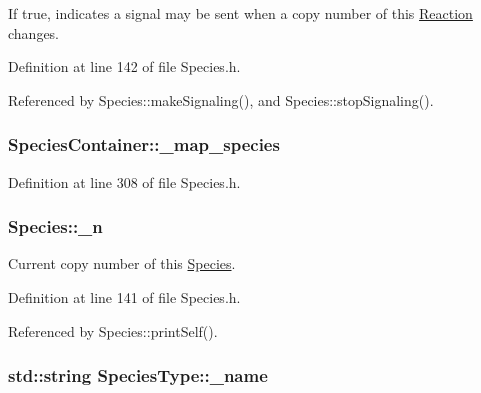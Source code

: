 If true, indicates a signal may be sent when a copy number of this \hyperlink{classReaction}{Reaction} changes. 



Definition at line 142 of file Species.\-h.



Referenced by Species\-::make\-Signaling(), and Species\-::stop\-Signaling().

\hypertarget{group__Chemistry_gab3e597371bf2edebc968a6980479e2da}{
\subsubsection[{\-\_\-map\-\_\-species}]{ {\bf Species\-Container\-::\-\_\-map\-\_\-species}}}\label{group__Chemistry_gab3e597371bf2edebc968a6980479e2da}


Definition at line 308 of file Species.\-h.

\hypertarget{group__Chemistry_gaec9a5cfb6a2f80e122f6369ae404b89d}{
\subsubsection[{\-\_\-n}]{ {\bf Species\-::\-\_\-n}}}\label{group__Chemistry_gaec9a5cfb6a2f80e122f6369ae404b89d}


Current copy number of this \hyperlink{classSpecies}{Species}. 



Definition at line 141 of file Species.\-h.



Referenced by Species\-::print\-Self().

\hypertarget{group__Chemistry_gac062140ac4d8e0b7d2e0b8e934a9cb9d}{
\subsubsection[{\-\_\-name}]{\setlength{\rightskip}{0pt plus 5cm}std\-::string {\bf Species\-Type\-::\-\_\-name}}}\label{group__Chemistry_gac062140ac4d8e0b7d2e0b8e934a9cb9d}


